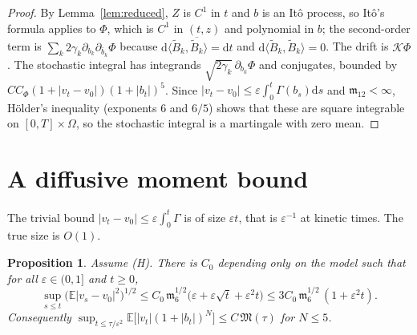 \documentclass[11pt]{article}
\newcommand{\dd}{\mathrm{d}}
\newcommand{\E}{\mathbb{E}}
\newcommand{\eps}{\varepsilon}
\newcommand{\cK}{\mathcal{K}}
\newcommand{\fm}{\mathfrak{m}}
\newcommand{\fM}{\mathfrak{M}}
\newtheorem{proposition}[theorem]{Proposition}
\theoremstyle{remark}
\begin{document}
\begin{proof}
By Lemma~\ref{lem:reduced}, $Z$ is $C^1$ in $t$ and $b$ is an It\^o process,
so It\^o's formula applies to $\Phi$, which is $C^1$ in $(t,z)$ and
polynomial in $b$; the second-order term is
$\sum_k2\gamma_k\partial_{b_k}\partial_{\bar b_k}\Phi$ because
$\dd\langle\tilde B_k,\overline{\tilde B_k}\rangle=\dd t$ and
$\dd\langle\tilde B_k,\tilde B_k\rangle=0$. The drift is $\cK\Phi$. The
stochastic integral has integrands $\sqrt{2\gamma_k}\,\partial_{b_k}\Phi$ and
conjugates, bounded by $CC_\Phi(1+|v_t-v_0|)(1+|b_t|)^{5}$. Since
$|v_t-v_0|\le\eps\int_0^t\Gamma(b_s)\dd s$ and $\fm_{12}<\infty$, H\"older's
inequality (exponents $6$ and $6/5$) shows that these are square integrable
on $[0,T]\times\Omega$, so the stochastic integral is a martingale with
zero mean.
\end{proof}

\section{A diffusive moment bound}

The trivial bound $|v_t-v_0|\le\eps\int_0^t\Gamma$ is of size $\eps t$,
that is $\eps^{-1}$ at kinetic times. The true size is $O(1)$.

\begin{proposition}\label{prop:mom}
Assume (H). There is $C_0$ depending only on the model such that for all
$\eps\in(0,1]$ and $t\ge0$,
\[
  \sup_{s\le t}\bigl(\E|v_s-v_0|^2\bigr)^{1/2}
  \le C_0\,\fm_6^{1/2}\bigl(\eps+\eps\sqrt t+\eps^2t\bigr)
  \le 3C_0\,\fm_6^{1/2}\,(1+\eps^2t).
\]
Consequently $\sup_{t\le\tau/\eps^2}\E\bigl[|v_t|(1+|b_t|)^N\bigr]\le
C\,\fM(\tau)$ for $N\le5$.
\end{proposition}
\end{document}
